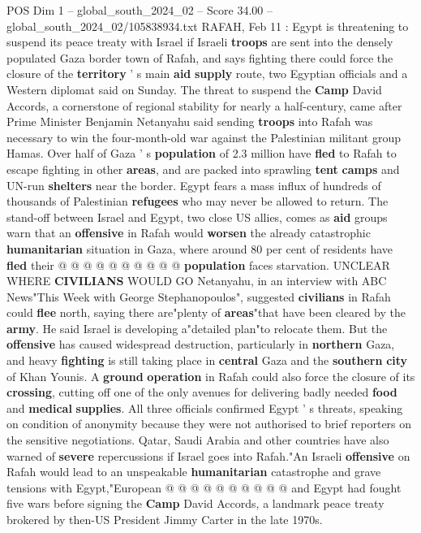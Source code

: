 \begin{textsample}{POS Dim 1 – global\_south\_2024\_02 – Score 34.00 – global\_south\_2024\_02/105838934.txt}  \label{ex:f1_pos_023}
RAFAH, Feb 11 : Egypt is threatening to suspend its peace treaty with Israel if Israeli \textbf{troops} are sent into the densely populated Gaza border town of Rafah, and says fighting there could force the closure of the \textbf{territory} ' s main \textbf{aid} \textbf{supply} route, two Egyptian officials and a Western diplomat said on Sunday.
The threat to suspend the \textbf{Camp} David Accords, a cornerstone of regional stability for nearly a half-century, came after Prime Minister Benjamin Netanyahu said sending \textbf{troops} into Rafah was necessary to win the four-month-old war against the Palestinian militant group Hamas.
Over half of Gaza ' s \textbf{population} of 2.3 million have \textbf{fled} to Rafah to escape fighting in other \textbf{areas}, and are packed into sprawling \textbf{tent} \textbf{camps} and UN-run \textbf{shelters} near the border.
Egypt fears a mass influx of hundreds of thousands of Palestinian \textbf{refugees} who may never be allowed to return.
The stand-off between Israel and Egypt, two close US allies, comes as \textbf{aid} groups warn that an \textbf{offensive} in Rafah would \textbf{worsen} the already catastrophic \textbf{humanitarian} situation in Gaza, where around 80 per cent of residents have \textbf{fled} their @ @ @ @ @ @ @ @ @ @ \textbf{population} faces starvation.
UNCLEAR WHERE \textbf{CIVILIANS} WOULD GO Netanyahu, in an interview with ABC News"This Week with George Stephanopoulos", suggested \textbf{civilians} in Rafah could \textbf{flee} north, saying there are"plenty of \textbf{areas}"that have been cleared by the \textbf{army}.
He said Israel is developing a"detailed plan"to relocate them.
But the \textbf{offensive} has caused widespread destruction, particularly in \textbf{northern} Gaza, and heavy \textbf{fighting} is still taking place in \textbf{central} Gaza and the \textbf{southern} \textbf{city} of Khan Younis.
A \textbf{ground} \textbf{operation} in Rafah could also force the closure of its \textbf{crossing}, cutting off one of the only avenues for delivering badly needed \textbf{food} and \textbf{medical} \textbf{supplies}.
All three officials confirmed Egypt ' s threats, speaking on condition of anonymity because they were not authorised to brief reporters on the sensitive negotiations.
Qatar, Saudi Arabia and other countries have also warned of \textbf{severe} repercussions if Israel goes into Rafah."An Israeli \textbf{offensive} on Rafah would lead to an unspeakable \textbf{humanitarian} catastrophe and grave tensions with Egypt,"European @ @ @ @ @ @ @ @ @ @ and Egypt had fought five wars before signing the \textbf{Camp} David Accords, a landmark peace treaty brokered by then-US President Jimmy Carter in the late 1970s.

\end{textsample}
